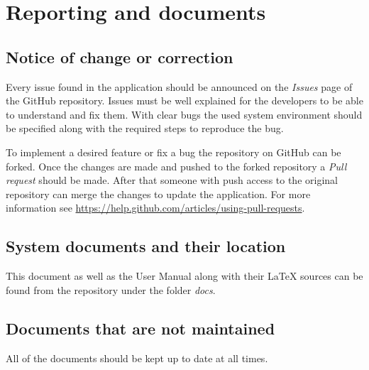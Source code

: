 \chapter{Reporting and documents}

\section{Notice of change or correction}

Every issue found in the application should be announced on the \emph{Issues}
page of the GitHub repository. Issues must be well explained for the developers
to be able to understand and fix them. With clear bugs the used system
environment should be specified along with the required steps to reproduce the
bug.

To implement a desired feature or fix a bug the repository on GitHub can be
forked. Once the changes are made and pushed to the forked repository a
\emph{Pull request} should be made. After that someone with push access to the
original repository can merge the changes to update the application. For more
information see \url{https://help.github.com/articles/using-pull-requests}. 

\section{System documents and their location}

This document as well as the User Manual along with their LaTeX sources can be
found from the repository under the folder \emph{docs}.

\section{Documents that are not maintained}

All of the documents should be kept up to date at all times.
